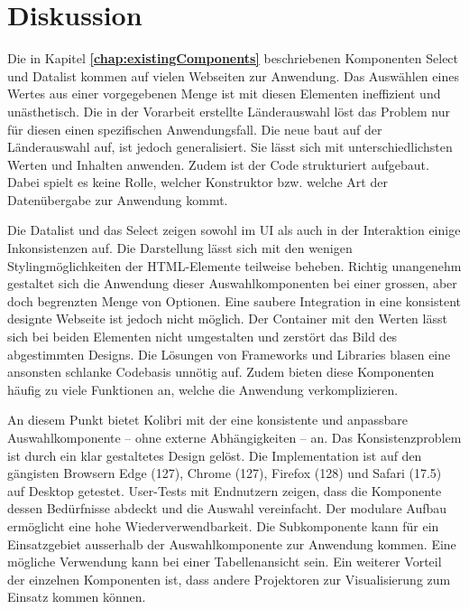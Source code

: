 \chapter{Diskussion}
\label{chap:discussion}

Die in Kapitel \textbf{\ref{chap:existingComponents}} beschriebenen Komponenten Select und Datalist kommen auf vielen Webseiten zur Anwendung. 
Das Auswählen eines Wertes aus einer vorgegebenen Menge ist mit diesen Elementen ineffizient und unästhetisch.
Die in der Vorarbeit erstellte Länderauswahl löst das Problem nur für diesen einen spezifischen Anwendungsfall. 
Die neue  baut auf der Länderauswahl auf, ist jedoch generalisiert. 
Sie lässt sich mit unterschiedlichsten Werten und Inhalten anwenden. 
Zudem ist der Code strukturiert aufgebaut. 
Dabei spielt es keine Rolle, welcher Konstruktor bzw. welche Art der Datenübergabe zur Anwendung kommt. 

Die Datalist und das Select zeigen sowohl im UI als auch in der Interaktion einige Inkonsistenzen auf. 
Die Darstellung lässt sich mit den wenigen Stylingmöglichkeiten der HTML-Elemente teilweise beheben. 
Richtig unangenehm gestaltet sich die Anwendung dieser Auswahlkomponenten bei einer grossen, aber doch begrenzten Menge von Optionen. 
Eine saubere Integration in eine konsistent designte Webseite ist jedoch nicht möglich.
Der Container mit den Werten lässt sich bei beiden Elementen nicht umgestalten und zerstört das Bild des abgestimmten Designs. 
Die Lösungen von Frameworks und Libraries blasen eine ansonsten schlanke Codebasis unnötig auf. 
Zudem bieten diese Komponenten häufig zu viele Funktionen an, welche die Anwendung verkomplizieren. 

An diesem Punkt bietet Kolibri mit der  eine konsistente und anpassbare Auswahlkomponente – ohne externe Abhängigkeiten – an. 
Das Konsistenzproblem ist durch ein klar gestaltetes Design gelöst. 
Die Implementation ist auf den gängisten Browsern Edge (127), Chrome (127), Firefox (128) und Safari (17.5) auf Desktop getestet. 
User-Tests mit Endnutzern zeigen, dass die Komponente dessen Bedürfnisse abdeckt und die Auswahl vereinfacht. 
Der modulare Aufbau ermöglicht eine hohe Wiederverwendbarkeit. 
Die Subkomponente  kann für ein Einsatzgebiet ausserhalb der Auswahlkomponente zur Anwendung kommen. 
Eine mögliche Verwendung kann bei einer Tabellenansicht sein. 
Ein weiterer Vorteil der einzelnen Komponenten ist, dass andere Projektoren zur Visualisierung zum Einsatz kommen können. 

